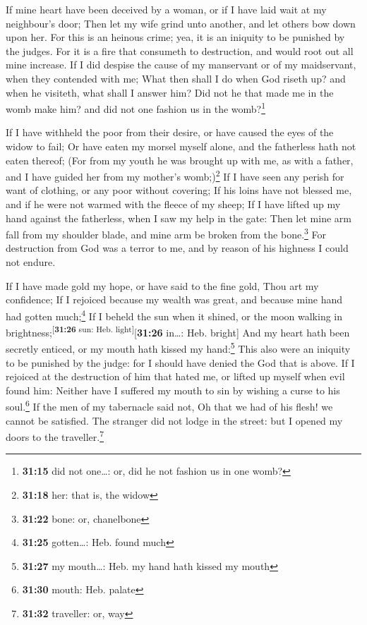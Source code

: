  If mine heart have been deceived by a woman, or if I have
laid wait at my neighbour's door;  Then let my wife grind
unto another, and let others bow down upon her.  For this
is an heinous crime; yea, it is an iniquity to be punished by the
judges.  For it is a fire that consumeth to destruction,
and would root out all mine increase.  If I did despise
the cause of my manservant or of my maidservant, when they contended
with me;  What then shall I do when God riseth up? and
when he visiteth, what shall I answer him?  Did not he
that made me in the womb make him? and did not one fashion us in the
womb?\footnote{\textbf{31:15} did not one\ldots: or, did he not fashion
  us in one womb?}

 If I have withheld the poor from their desire, or have
caused the eyes of the widow to fail;  Or have eaten my
morsel myself alone, and the fatherless hath not eaten thereof;
 (For from my youth he was brought up with me, as with a
father, and I have guided her from my mother's womb;)\footnote{\textbf{31:18}
  her: that is, the widow}  If I have seen any perish for
want of clothing, or any poor without covering;  If his
loins have not blessed me, and if he were not warmed with the fleece of
my sheep;  If I have lifted up my hand against the
fatherless, when I saw my help in the gate:  Then let
mine arm fall from my shoulder blade, and mine arm be broken from the
bone.\footnote{\textbf{31:22} bone: or, chanelbone}  For
destruction from God was a terror to me, and by reason of his highness I
could not endure.

 If I have made gold my hope, or have said to the fine
gold, Thou art my confidence;  If I rejoiced because my
wealth was great, and because mine hand had gotten much;\footnote{\textbf{31:25}
  gotten\ldots: Heb. found much}  If I beheld the sun
when it shined, or the moon walking in
brightness;\textsuperscript{{[}\textbf{31:26} sun: Heb.
light{]}}{[}\textbf{31:26} in\ldots: Heb. bright{]}  And
my heart hath been secretly enticed, or my mouth hath kissed my
hand:\footnote{\textbf{31:27} my mouth\ldots: Heb. my hand hath kissed
  my mouth}  This also were an iniquity to be punished by
the judge: for I should have denied the God that is above.
 If I rejoiced at the destruction of him that hated me,
or lifted up myself when evil found him:  Neither have I
suffered my mouth to sin by wishing a curse to his soul.\footnote{\textbf{31:30}
  mouth: Heb. palate}  If the men of my tabernacle said
not, Oh that we had of his flesh! we cannot be satisfied.
 The stranger did not lodge in the street: but I opened
my doors to the traveller.\footnote{\textbf{31:32} traveller: or, way}

